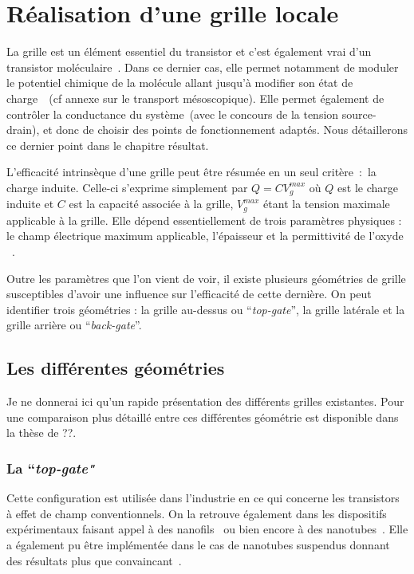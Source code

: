 \section{Réalisation d'une grille locale}
La grille est un élément essentiel du transistor et c'est également vrai d'un transistor moléculaire~\cite{Datta2009,Zant2006}. Dans ce dernier cas, elle permet notamment de moduler le potentiel chimique de la molécule allant jusqu'à modifier son état de charge~\cite{Beenakker1991,Wiel2002,Hanson2007}~(cf annexe sur le transport mésoscopique). Elle permet également de contrôler la conductance du système~(avec le concours de la tension source-drain), et donc de choisir des points de fonctionnement adaptés. Nous détaillerons ce dernier point dans le chapitre résultat. 

L'efficacité intrinsèque d'une grille peut être résumée en un seul critère~:~la charge induite. Celle-ci s'exprime simplement par $Q = CV_g^{max}$ où $Q$ est le charge induite et $C$ est la capacité associée à la grille, $V_g^{max}$ étant la tension maximale applicable à la grille. Elle dépend essentiellement de trois paramètres physiques : le champ électrique maximum applicable, l'épaisseur et la permittivité de l'oxyde ~\cite{Biercuk2003}. 

Outre les paramètres que l'on vient de voir, il existe plusieurs géométries de grille susceptibles d'avoir une influence sur l’efficacité de cette dernière. On peut identifier trois géométries : la grille au-dessus ou  ``\textit{top-gate}'', la grille latérale et la grille arrière ou  ``\textit{back-gate}''.

\subsection{Les différentes géométries}
Je ne donnerai ici qu'un rapide présentation des différents grilles existantes. Pour une comparaison plus détaillé entre ces différentes géométrie est disponible dans la thèse de ??.
\subsubsection{La ``\textit{top-gate"}}
Cette configuration est utilisée dans l'industrie en ce qui concerne les transistors à effet de champ conventionnels. On la retrouve également dans les dispositifs expérimentaux faisant appel à des nanofils~\cite{Fasth2005} ou bien encore à des nanotubes~\cite{Javey2002}. Elle a également pu être implémentée dans le cas de nanotubes suspendus donnant des résultats plus que convaincant~\cite{Leturcq2009}.

